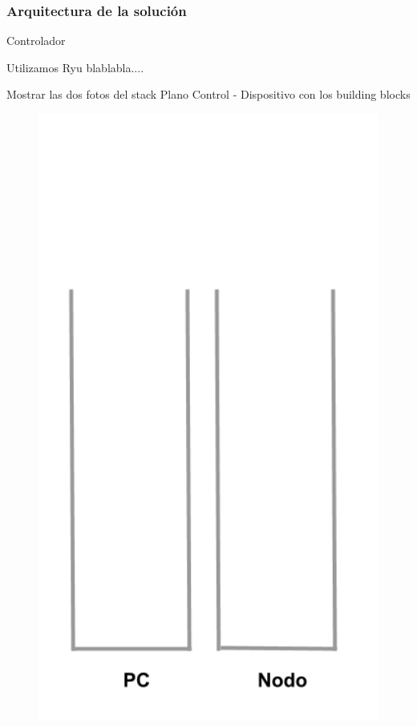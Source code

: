 \documentclass{beamer}
\begin{document}
\begin{frame}
\frametitle{Arquitectura de la soluci\'on} 


\begin{minipage}{0.60\textwidth}
Controlador

Utilizamos Ryu blablabla....

Mostrar las dos fotos del stack Plano Control - Dispositivo con los building blocks

\end{minipage}
\hfill
\begin{minipage}{0.30\textwidth}
\begin{figure}[H]
\raggedright
\includegraphics[width=1.0\textwidth, right]{imagenes/Stack.png}
\end{figure}
\end{minipage} 


\end{frame}
\end{document}
